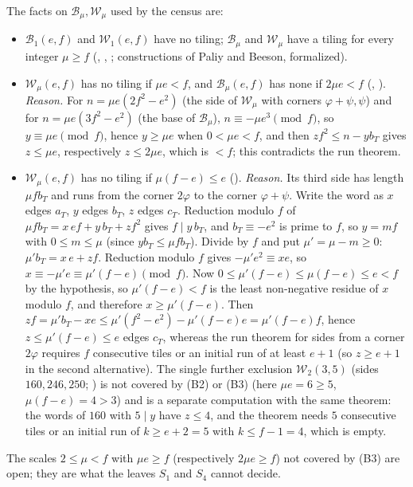 \documentclass[11pt,reqno]{amsart}
\theoremstyle{plain}
\theoremstyle{definition}
\begin{document}
The facts on $\mathcal B_\mu,\mathcal W_\mu$ used by the census are:
\begin{itemize}
\item[\textup{(B1)}] $\mathcal B_1(e,f)$ and $\mathcal W_1(e,f)$ have no tiling; $\mathcal B_\mu$ and $\mathcal W_\mu$ have a tiling for every integer $\mu\ge f$ (, , ; constructions of Paliy and Beeson, formalized).
\item[\textup{(B2)}] $\mathcal W_\mu(e,f)$ has no tiling if $\mu e<f$, and $\mathcal B_\mu(e,f)$ has none if $2\mu e<f$ (, ). \emph{Reason.} For $n=\mu e(2f^2-e^2)$ (the side of $\mathcal W_\mu$ with corners $\varphi+\psi,\psi$) and for $n=\mu e(3f^2-e^2)$ (the base of $\mathcal B_\mu$), $n\equiv-\mu e^3\pmod f$, so $y\equiv\mu e\pmod f$, hence $y\ge\mu e$ when $0<\mu e<f$, and then $zf^2\le n-yb_T$ gives $z\le\mu e$, respectively $z\le2\mu e$, which is $<f$; this contradicts the run theorem.
\item[\textup{(B3)}] $\mathcal W_\mu(e,f)$ has no tiling if $\mu(f-e)\le e$ (). \emph{Reason.} Its third side has length $\mu fb_T$ and runs from the corner $2\varphi$ to the corner $\varphi+\psi$. Write the word as $x$ edges $a_T$, $y$ edges $b_T$, $z$ edges $c_T$. Reduction modulo $f$ of $\mu fb_T=x\,ef+y\,b_T+zf^2$ gives $f\mid y\,b_T$, and $b_T\equiv-e^2$ is prime to $f$, so $y=mf$ with $0\le m\le\mu$ (since $yb_T\le\mu fb_T$). Divide by $f$ and put $\mu'=\mu-m\ge0$: $\mu'b_T=x\,e+zf$. Reduction modulo $f$ gives $-\mu'e^2\equiv xe$, so $x\equiv-\mu'e\equiv\mu'(f-e)\pmod f$. Now $0\le\mu'(f-e)\le\mu(f-e)\le e<f$ by the hypothesis, so $\mu'(f-e)<f$ is the least non-negative residue of $x$ modulo $f$, and therefore $x\ge\mu'(f-e)$. Then $zf=\mu'b_T-xe\le\mu'(f^2-e^2)-\mu'(f-e)e=\mu'(f-e)f$, hence $z\le\mu'(f-e)\le e$ edges $c_T$, whereas the run theorem for sides from a corner $2\varphi$ requires $f$ consecutive tiles or an initial run of at least $e+1$ (so $z\ge e+1$ in the second alternative). The single further exclusion $\mathcal W_2(3,5)$ (sides $160,246,250$; ) is not covered by (B2) or (B3) (here $\mu e=6\ge5$, $\mu(f-e)=4>3$) and is a separate computation with the same theorem: the words of $160$ with $5\mid y$ have $z\le4$, and the theorem needs $5$ consecutive tiles or an initial run of $k\ge e+2=5$ with $k\le f-1=4$, which is empty.
\end{itemize}
The scales $2\le\mu<f$ with $\mu e\ge f$ (respectively $2\mu e\ge f$) not covered by (B3) are open; they are what the leaves $S_1$ and $S_4$ cannot decide.
\end{document}
